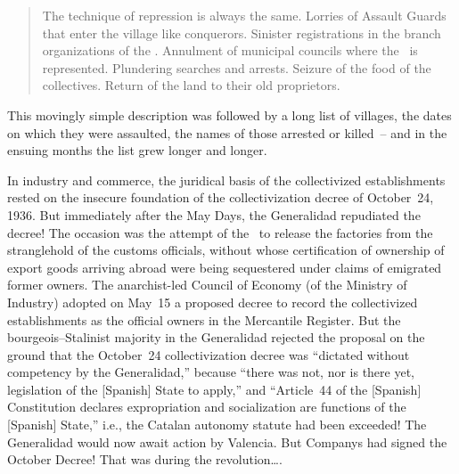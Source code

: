 \begin{quotation}
  The technique of repression is always the same. Lorries of Assault Guards that enter the village like conquerors. Sinister registrations in the branch organizations of the \CNT. Annulment of municipal councils where the \CNT\ is represented. Plundering searches and arrests. Seizure of the food of the collectives. Return of the land to their old proprietors.
\end{quotation}

This movingly simple description was followed by a long list of villages, the dates on which they were assaulted, the names of those arrested or killed~-- and in the ensuing months the list grew longer and longer\kn.

In industry and commerce, the juridical basis of the collectivized establishments rested on the insecure foundation of the collectivization decree of October~24, 1936. But immediately after the May Days, the Generalidad repudiated the decree! The occasion was the attempt of the \CNT\ to release the factories from the stranglehold of the customs officials, without whose certification of ownership of export goods arriving abroad were being sequestered under claims of emigrated former owners. The anarchist-led Council of Economy (of the Ministry of Industry) adopted on May~15 a proposed decree to record the collectivized establishments as the official owners in the Mercantile Register. But the bourgeois--Stalinist majority in the Generalidad rejected the proposal on the ground that the October~24 collectivization decree was ``dictated without competency by the Generalidad,\kn\kn'' because ``there was not, nor is there yet, legislation of the [Spanish] State to apply,\kn\kn'' and ``Article~44 of the [Spanish] Constitution declares expropriation and socialization are functions of the [Spanish] State,\kn\kn'' i.e., the Catalan autonomy statute had been exceeded! The Generalidad would now await action by Valencia. But Companys had signed the October Decree! That was during the revolution\dots.

\dinkus

